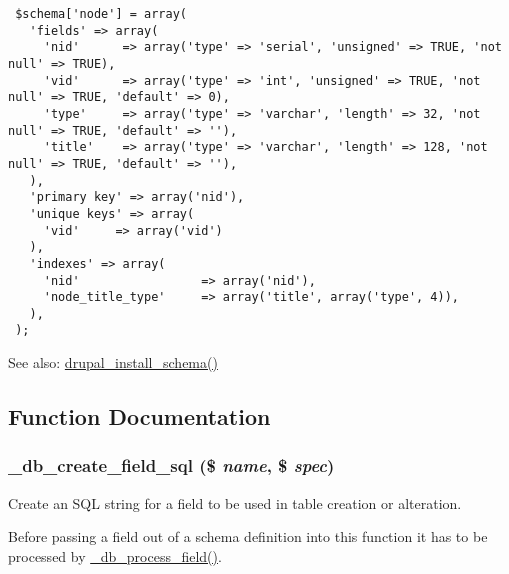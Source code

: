 \begin{Code}\begin{verbatim} $schema['node'] = array(
   'fields' => array(
     'nid'      => array('type' => 'serial', 'unsigned' => TRUE, 'not null' => TRUE),
     'vid'      => array('type' => 'int', 'unsigned' => TRUE, 'not null' => TRUE, 'default' => 0),
     'type'     => array('type' => 'varchar', 'length' => 32, 'not null' => TRUE, 'default' => ''),
     'title'    => array('type' => 'varchar', 'length' => 128, 'not null' => TRUE, 'default' => ''),
   ),
   'primary key' => array('nid'),
   'unique keys' => array(
     'vid'     => array('vid')
   ),
   'indexes' => array(
     'nid'                 => array('nid'),
     'node_title_type'     => array('title', array('type', 4)),
   ),
 );
\end{verbatim}
\end{Code}



\begin{Desc}
\item[See also:]\hyperlink{group__schemaapi_g9706b8d6ecdac10302d83bd50935a698}{drupal\_\-install\_\-schema()} \end{Desc}


\subsection{Function Documentation}
\hypertarget{group__schemaapi_ge5ec976573ad46239192dcd139d07f10}{
\subsubsection[{\_\-db\_\-create\_\-field\_\-sql}]{\setlength{\rightskip}{0pt plus 5cm}\_\-db\_\-create\_\-field\_\-sql (\$ {\em name}, \/  \$ {\em spec})}}
\label{group__schemaapi_ge5ec976573ad46239192dcd139d07f10}


Create an SQL string for a field to be used in table creation or alteration.

Before passing a field out of a schema definition into this function it has to be processed by \hyperlink{group__schemaapi_g4c5486f85f0d1feeb4efba32f01926fb}{\_\-db\_\-process\_\-field()}.


